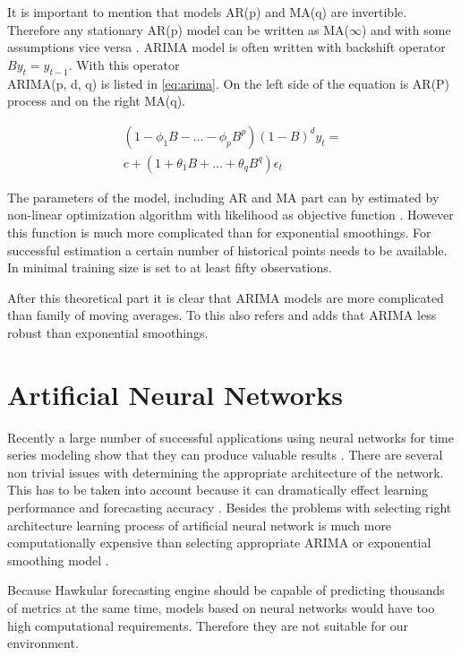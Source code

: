     It is important to mention that models AR(p) and MA(q) are invertible. Therefore any stationary AR(p) model can
    be written as MA($\infty$) and with some assumptions vice versa \cite{brockwell}. ARIMA model is often written
    with backshift operator $By_t=y_{t-1}$. With this operator \\ARIMA(p, d, q) is listed in \ref{eq:arima}. On the
    left side of the equation is AR(P) process and on the right MA(q).

    \begin{gather} \label{eq:arima}
        (1- \phi_1B - \dots - \phi_pB^p)(1-B)^d y_t = \\ \nonumber
         c + (1+\theta_1B+\dots+\theta_qB^q) \epsilon_t
    \end{gather}

    The parameters of the model, including AR and MA part can by estimated by non-linear optimization algorithm
    with likelihood as objective function \cite{brockwell}. However this function is much more complicated than for
    exponential smoothings. For successful estimation a certain number of historical points needs to
    be available. In \cite{cipra} minimal training size is set to at least fifty observations.

    After this theoretical part it is clear that ARIMA models are more complicated than family of moving averages.
    To this also refers \cite{hyndman-forecasting} and adds that ARIMA less robust than exponential smoothings.

    \section{Artificial Neural Networks} \label{sec:ann}
    Recently a large number of successful applications using neural networks for time series modeling show that they
    can produce valuable results \cite{ann-forecasting-state-art}. There are several non trivial issues with
    determining the appropriate architecture of the network. This has to be taken into account because it can
    dramatically effect learning performance and forecasting accuracy \cite{ann-model-selecting}.
    Besides the problems with selecting right architecture learning process of artificial neural network is much more
    computationally expensive than selecting appropriate ARIMA or exponential smoothing model \cite{ann-forecasting}.

    Because Hawkular forecasting engine should be capable of predicting thousands of metrics at the same time, models
    based on neural networks would have too high computational requirements. Therefore they are not suitable for our
    environment.

